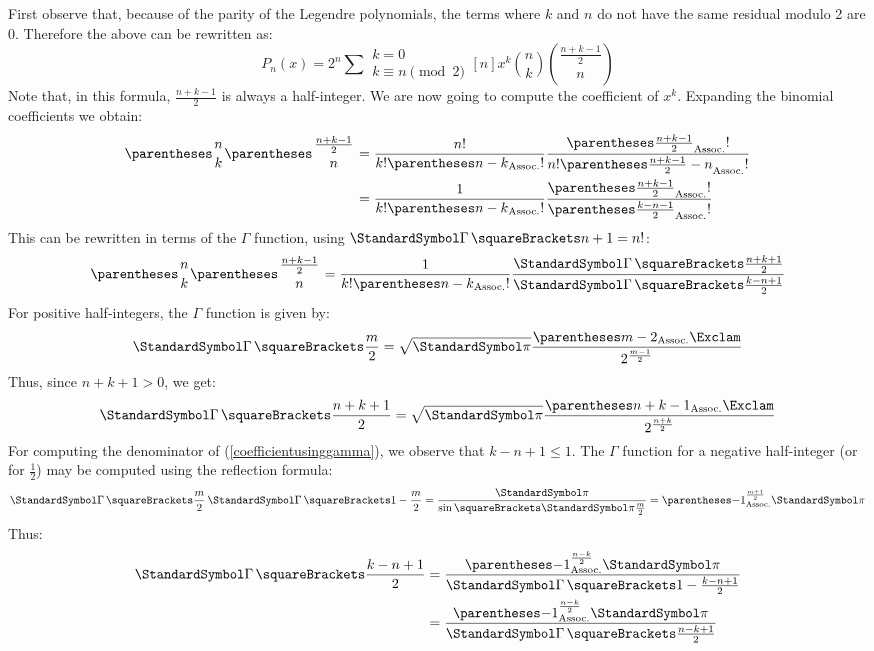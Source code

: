 \documentclass[10pt, a4paper, oneside]{basestyle}
\begin{document}
First observe that, because of the parity of the Legendre polynomials, the terms where $k$ and $n$ do not have the same residual modulo 2 are 0.  Therefore the above can be rewritten as:
\begin{equation*}
P_n(x) = 2^n \sum{\substack{k = 0\\ k \equiv n \pmod 2}}[n] x^k \binom{n}{k} \binom{\frac{n + k - 1}{2}}{n}
\end{equation*}
Note that, in this formula, $\frac{n + k - 1}{2}$ is always a half-integer.  We are now going to compute the coefficient of $x^k$.  Expanding the binomial coefficients we obtain:
\begin{align*}
\binom{n}{k} \binom{\frac{n + k - 1}{2}}{n} &=
  \frac{\Factorial{n}}
       {\Factorial{k}\Factorial{\pa{n - k}}}
  \frac{\Factorial{\pa{\frac{n + k - 1}{2}}}}
       {\Factorial{n}\Factorial{\pa{\frac{n + k - 1}{2} - n}}}\\
&=
  \frac{1}
       {\Factorial{k}\Factorial{\pa{n - k}}}
  \frac{\Factorial{\pa{\frac{n + k - 1}{2}}}}
       {\Factorial{\pa{\frac{k - n - 1}{2}}}}
\end{align*}
This can be rewritten in terms of the $\Gamma$ function, using $\Gamma\of{n + 1} = \Factorial{n}$:
\begin{equation}
\label{coefficientusinggamma}
\binom{n}{k} \binom{\frac{n + k - 1}{2}}{n} =
  \frac{1}
       {\Factorial{k}\Factorial{\pa{n - k}}}
  \frac{\Gamma\of{\frac{n + k + 1}{2}}}
       {\Gamma\of{\frac{k - n + 1}{2}}}
\end{equation}
For positive half-integers, the $\Gamma$ function is given by:
\begin{equation}
\label{gammahalfinteger}
\Gamma\of{\frac{m}{2}} =
  \sqrt{\Pi}
  \frac{\DoubleFactorial{\pa{m - 2}}}{2^{\frac{m - 1}{2}}}
\end{equation}
Thus, since $n + k + 1 > 0$, we get:
\begin{equation*}
\Gamma\of{\frac{n + k + 1}{2}} =
  \sqrt{\Pi}
  \frac{\DoubleFactorial{\pa{n + k - 1}}}{2^{\frac{n + k}{2}}}
\end{equation*}
For computing the denominator of (\ref{coefficientusinggamma}), we observe that $k - n + 1 \leq 1$.  The $\Gamma$ function for a negative half-integer (or for $\frac{1}{2}$) may be computed using the reflection formula:
\begin{equation*}
\Gamma\of{\frac{m}{2}}\Gamma\of{1 - \frac{m}{2}} = \frac{\Pi}{\sin\of{\Pi\frac{m}{2}}} = \pa{-1}^{\frac{m + 1}{2}} \Pi
\end{equation*}
Thus:
\begin{align*}
\Gamma\of{\frac{k - n + 1}{2}} &= \frac{\pa{-1}^{\frac{n - k}{2}} \Pi}{\Gamma\of{1 - \frac{k - n + 1}{2}}}\\
&= \frac{\pa{-1}^{\frac{n - k}{2}} \Pi}{\Gamma\of{\frac{n - k + 1}{2}}}
\end{align*}
\end{document}
